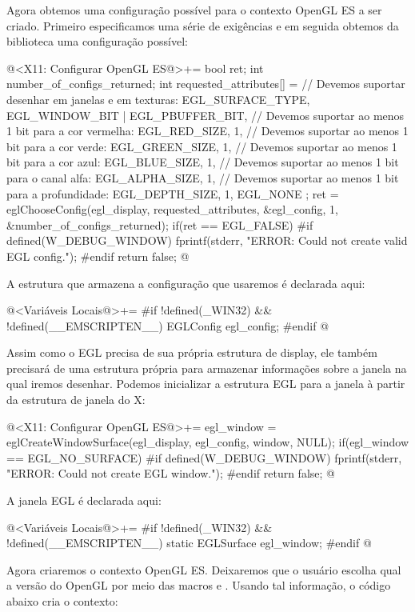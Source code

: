 Agora obtemos uma configuração possível para o contexto OpenGL ES a
ser criado. Primeiro especificamos uma série de exigências e em
seguida obtemos da biblioteca uma configuração possível:

\iniciocodigo
@<X11: Configurar OpenGL ES@>+=
{
  bool ret;
  int number_of_configs_returned;
  int requested_attributes[] = {
    // Devemos suportar desenhar em janelas e em texturas:
    EGL_SURFACE_TYPE,  EGL_WINDOW_BIT | EGL_PBUFFER_BIT,
    // Devemos suportar ao menos 1 bit para a cor vermelha:
    EGL_RED_SIZE, 1,
    // Devemos suportar ao menos 1 bit para a cor verde:
    EGL_GREEN_SIZE, 1,
    // Devemos suportar ao menos 1 bit para a cor azul:
    EGL_BLUE_SIZE, 1,
    // Devemos suportar ao menos 1 bit para o canal alfa:
    EGL_ALPHA_SIZE, 1,
    // Devemos suportar ao menos 1 bit para a profundidade:
    EGL_DEPTH_SIZE, 1,
    EGL_NONE
  };
  ret = eglChooseConfig(egl_display, requested_attributes,
                        &egl_config, 1, &number_of_configs_returned);
  if(ret == EGL_FALSE){
#if defined(W_DEBUG_WINDOW)
    fprintf(stderr, "ERROR: Could not create valid EGL config.\n");
#endif
    return false;
  }
}
@
\fimcodigo

A estrutura que armazena a configuração que usaremos é declarada aqui:

\iniciocodigo
@<Variáveis Locais@>+=
#if !defined(_WIN32) && !defined(__EMSCRIPTEN__)
EGLConfig egl_config;
#endif
@
\fimcodigo


Assim como o EGL precisa de sua própria estrutura de display, ele
também precisará de uma estrutura própria para armazenar informações
sobre a janela na qual iremos desenhar. Podemos inicializar a
estrutura EGL para a janela à partir da estrutura de janela do X:

\iniciocodigo
@<X11: Configurar OpenGL ES@>+=
egl_window = eglCreateWindowSurface(egl_display, egl_config, window,
                                    NULL);
if(egl_window == EGL_NO_SURFACE){
#if defined(W_DEBUG_WINDOW)
  fprintf(stderr, "ERROR: Could not create EGL window.\n");
#endif
  return false;
}
@
\fimcodigo

A janela EGL é declarada aqui:

\iniciocodigo
@<Variáveis Locais@>+=
#if !defined(_WIN32) && !defined(__EMSCRIPTEN__)
static EGLSurface egl_window;
#endif
@
\fimcodigo


Agora criaremos o contexto OpenGL ES. Deixaremos que o usuário escolha
qual a versão do OpenGL por meio das
macros  e
. Usando tal informação, o código abaixo cria o contexto:

